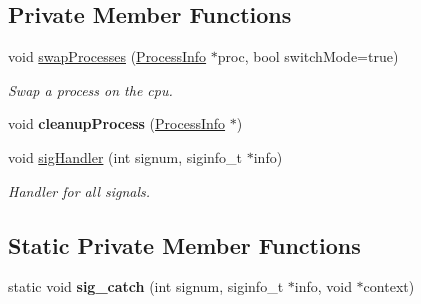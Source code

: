 \subsection*{\-Private \-Member \-Functions}
\begin{DoxyCompactItemize}
\item 
void \hyperlink{classcKernel_a1b8e06f240c1bb7d0c4d0d30bcc55e18}{swap\-Processes} (\hyperlink{structProcessInfo}{\-Process\-Info} $\ast$proc, bool switch\-Mode=true)
\begin{DoxyCompactList}\small\item\em \-Swap a process on the cpu. \end{DoxyCompactList}\item 
\hypertarget{classcKernel_abcc0464e62a5fb82ddf4a3f8ba5ec461}{void {\bfseries cleanup\-Process} (\hyperlink{structProcessInfo}{\-Process\-Info} $\ast$)}\label{db/da5/classcKernel_abcc0464e62a5fb82ddf4a3f8ba5ec461}

\item 
void \hyperlink{classcKernel_a60ccaffeee3cfcfdfb4aa7b9e33b19f4}{sig\-Handler} (int signum, siginfo\-\_\-t $\ast$info)
\begin{DoxyCompactList}\small\item\em \-Handler for all signals. \end{DoxyCompactList}\end{DoxyCompactItemize}
\subsection*{\-Static \-Private \-Member \-Functions}
\begin{DoxyCompactItemize}
\item 
\hypertarget{classcKernel_a571bb344ba50970d9c4a1cb5b500bbcd}{static void {\bfseries sig\-\_\-catch} (int signum, siginfo\-\_\-t $\ast$info, void $\ast$context)}\label{db/da5/classcKernel_a571bb344ba50970d9c4a1cb5b500bbcd}

\end{DoxyCompactItemize}
